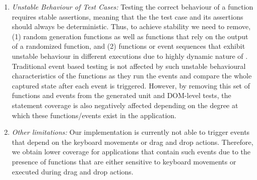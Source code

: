 \begin{enumerate}
\item \textit{Unstable Behaviour of Test Cases:} Testing the correct behaviour of a function requires stable assertions, meaning that
the the test case and its assertions should always be deterministic. 
Thus, to achieve stability we need to remove, (1)  random generation functions as well as functions that rely on the output of a randomized function, and (2) functions or event sequences that exhibit unstable behaviour in different executions due to highly dynamic nature of \javascript. 
Traditional event based testing is not affected by such unstable behavioural characteristics of the functions as they run the events and compare the whole captured state after each event is triggered. However, by removing this set of functions and events from the generated unit and DOM-level tests, the statement coverage is also negatively affected depending on the degree at which these functions/events exist in the application.

\item \textit{Other limitations:} Our implementation is currently not able to trigger events that depend on the keyboard movements or drag and drop actions. 
Therefore, we obtain lower coverage for applications that contain such events due to the presence of functions that are either sensitive to keyboard movements or executed during drag and drop actions.
\end{enumerate}  


      